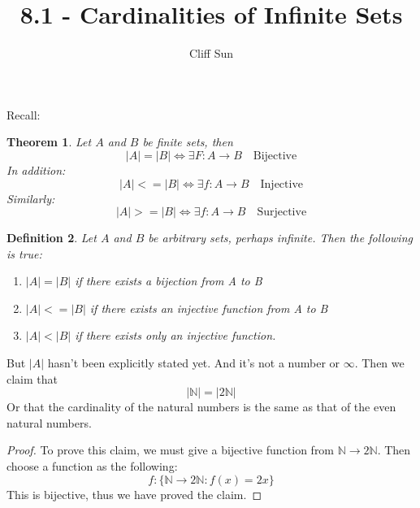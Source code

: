\documentclass{article}
\title{8.1 - Cardinalities of Infinite Sets}
\author{Cliff Sun}
\newtheorem{theorem}{Theorem}[section]
\newtheorem{definition}[theorem]{Definition}
\begin{document}
\maketitle

Recall:

\begin{theorem}
    Let $A$ and $B$ be finite sets, then 
    \begin{equation}
        |A| = |B| \iff \exists F: A \rightarrow B \quad \textrm{Bijective}
    \end{equation}
    In addition:
    \begin{equation}
        |A| <= |B| \iff \exists f: A \rightarrow B \quad \textrm{Injective}
    \end{equation}
    Similarly:
    \begin{equation}
        |A| >= |B| \iff \exists f: A \rightarrow B \quad \textrm{Surjective}
    \end{equation}
\end{theorem}

\begin{definition}
    Let $A$ and $B$ be arbitrary sets, perhaps infinite. Then the following is true:
    \begin{enumerate}
        \item $|A| = |B|$ if there exists a bijection from A to B
        \item $|A| <= |B|$ if there exists an injective function from A to B
        \item $|A| < |B|$ if there exists only an injective function. 
    \end{enumerate}
\end{definition}

But $|A|$ hasn't been explicitly stated yet. And it's not a number or $\infty$. Then we claim that 
\begin{equation}
    |\mathbb{N}| = |2\mathbb{N}|
\end{equation}
Or that the cardinality of the natural numbers is the same as that of the even natural numbers. 

\begin{proof}
    To prove this claim, we must give a bijective function from $\mathbb{N} \rightarrow 2\mathbb{N}$. Then choose a function as the following:
    \begin{equation}
        f: \{\mathbb{N} \rightarrow 2\mathbb{N} : f(x) = 2x \}
    \end{equation} 
    This is bijective, thus we have proved the claim. 
\end{proof}
\end{document}
